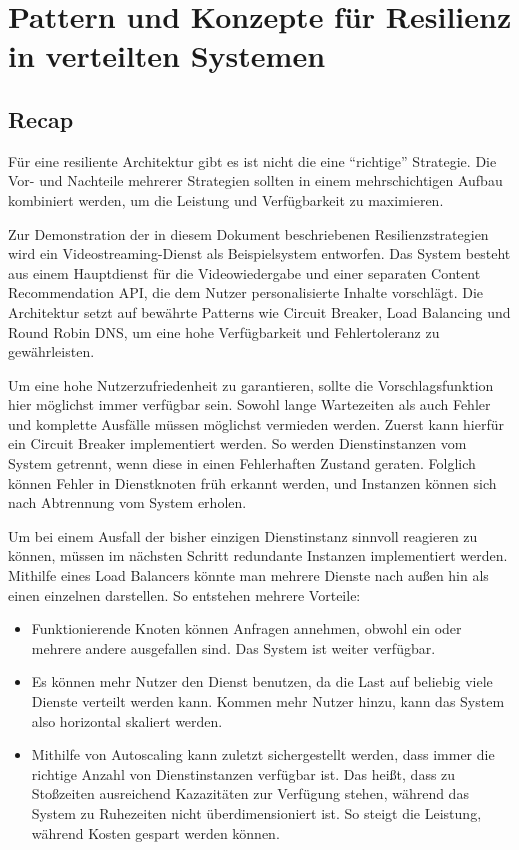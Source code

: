 \section{Pattern und Konzepte für Resilienz in verteilten Systemen}








\subsection{Recap}

Für eine resiliente Architektur gibt es ist nicht die eine \enquote{richtige} Strategie. Die Vor- und Nachteile mehrerer Strategien sollten in einem mehrschichtigen Aufbau kombiniert werden, um die Leistung und Verfügbarkeit zu maximieren.

Zur Demonstration der in diesem Dokument beschriebenen Resilienzstrategien wird ein Videostreaming-Dienst als Beispielsystem entworfen. Das System besteht aus einem Hauptdienst für die Videowiedergabe und einer separaten Content Recommendation API, die dem Nutzer personalisierte Inhalte vorschlägt. Die Architektur setzt auf bewährte Patterns wie Circuit Breaker, Load Balancing und Round Robin DNS, um eine hohe Verfügbarkeit und Fehlertoleranz zu gewährleisten.

Um eine hohe Nutzerzufriedenheit zu garantieren, sollte die Vorschlagsfunktion hier möglichst immer verfügbar sein. Sowohl lange Wartezeiten als auch Fehler und komplette Ausfälle müssen möglichst vermieden werden. Zuerst kann hierfür ein Circuit Breaker implementiert werden. So werden Dienstinstanzen vom System getrennt, wenn diese in einen Fehlerhaften Zustand geraten. Folglich können Fehler in Dienstknoten früh erkannt werden, und Instanzen können sich nach Abtrennung vom System erholen.

Um bei einem Ausfall der bisher einzigen Dienstinstanz sinnvoll reagieren zu können, müssen im nächsten Schritt redundante Instanzen implementiert werden. Mithilfe eines Load Balancers könnte man mehrere Dienste nach außen hin als einen einzelnen darstellen. So entstehen mehrere Vorteile: 
\begin{itemize}
	\item Funktionierende Knoten können Anfragen annehmen, obwohl ein oder mehrere andere ausgefallen sind. Das System ist weiter verfügbar.
	\item Es können mehr Nutzer den Dienst benutzen, da die Last auf beliebig viele Dienste verteilt werden kann. Kommen mehr Nutzer hinzu, kann das System also horizontal skaliert werden.
	\item Mithilfe von Autoscaling kann zuletzt sichergestellt werden, dass immer die richtige Anzahl von Dienstinstanzen verfügbar ist. Das heißt, dass zu Stoßzeiten ausreichend Kazazitäten zur Verfügung stehen, während das System zu Ruhezeiten nicht überdimensioniert ist. So steigt die Leistung, während Kosten gespart werden können.
\end{itemize}

